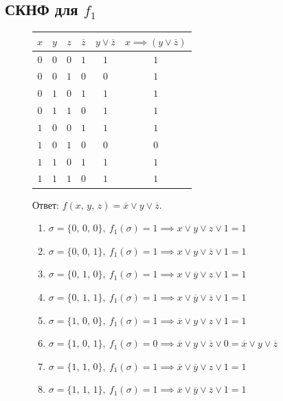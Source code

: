 \documentclass[12pt,a4paper]{article}
\theoremstyle{plain}
\theoremstyle{definition}
\theoremstyle{remark}
\numberwithin{equation}{section}
\begin{document}
\subsection{СКНФ для $f_1$}

\begin{figure}[H]
  \begin{minipage}[t]{0.38\textwidth}
    \vspace{0em}
    \begin{tabularx}{\textwidth}{|c|c|c|c|c|C|}
      \hline
      $x$ & $y$ & $z$ & $\overline{z}$ & $y \lor \overline{z}$ & $x \implies (y \lor \overline{z})$ \\
      \hline
      $0$ & $0$ & $0$ & $1$ & $1$ & $1$ \\
      $0$ & $0$ & $1$ & $0$ & $0$ & $1$ \\  
      $0$ & $1$ & $0$ & $1$ & $1$ & $1$ \\
      $0$ & $1$ & $1$ & $0$ & $1$ & $1$ \\
      $1$ & $0$ & $0$ & $1$ & $1$ & $1$ \\
      $1$ & $0$ & $1$ & $0$ & $0$ & $0$ \\
      $1$ & $1$ & $0$ & $1$ & $1$ & $1$ \\
      $1$ & $1$ & $1$ & $0$ & $1$ & $1$ \\
      \hline  
    \end{tabularx}    
    
    \vspace{0.5em}
    \noindent Ответ: $f(x,\,y,\,z) = \overline x \lor y \lor \overline z$.
  \end{minipage} \hfill 
  \begin{minipage}[t]{0.6\textwidth}
    \vspace{0em}
    \begin{enumerate}
      \item $\sigma = \{0,\,0,\,0\},\ f_1(\sigma) = 1 \implies x \lor y \lor z \lor 1 = 1$
      \item $\sigma = \{0,\,0,\,1\},\ f_1(\sigma) = 1 \implies x \lor y \lor \overline{z} \lor 1 = 1$
      \item $\sigma = \{0,\,1,\,0\},\ f_1(\sigma) = 1 \implies x\lor \overline{y} \lor z \lor 1 = 1$
      \item $\sigma = \{0,\,1,\,1\},\ f_1(\sigma) = 1 \implies x \lor \overline{y} \lor \overline z \lor 1 = 1$
      \item $\sigma = \{1,\,0,\,0\},\ f_1(\sigma) = 1 \implies \overline{x} \lor y \lor z \lor 1 = 1$
      \item $\sigma = \{1,\,0,\,1\},\ f_1(\sigma) = 0 \implies \overline{x} \lor y \lor \overline{z} \lor 0 = \overline{x} \lor y \lor \overline{z}$
      \item $\sigma = \{1,\,1,\,0\},\ f_1(\sigma) = 1 \implies \overline{x} \lor \overline{y} \lor z \lor 1 = 1$
      \item $\sigma = \{1,\,1,\,1\},\ f_1(\sigma) = 1 \implies \overline{x} \lor \overline y \lor \overline z \lor 1 = 1$
    \end{enumerate}
  \end{minipage}
\end{figure}
\end{document}
